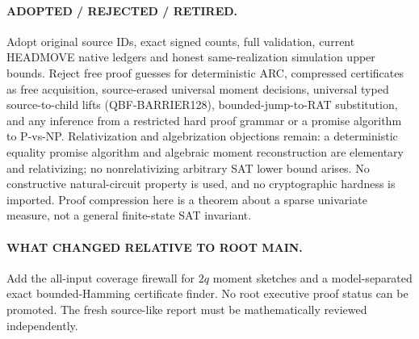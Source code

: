 \documentclass[11pt]{article}
\begin{document}
\paragraph{ADOPTED / REJECTED / RETIRED.} Adopt original source IDs, exact signed counts, full validation, current HEADMOVE native ledgers and honest same-realization simulation upper bounds. Reject free proof guesses for deterministic ARC, compressed certificates as free acquisition, source-erased universal moment decisions, universal typed source-to-child lifts (QBF-BARRIER128), bounded-jump-to-RAT substitution, and any inference from a restricted hard proof grammar or a promise algorithm to P-vs-NP. Relativization and algebrization objections remain: a deterministic equality promise algorithm and algebraic moment reconstruction are elementary and relativizing; no nonrelativizing arbitrary SAT lower bound arises. No constructive natural-circuit property is used, and no cryptographic hardness is imported. Proof compression here is a theorem about a sparse univariate measure, not a general finite-state SAT invariant.
\paragraph{WHAT CHANGED RELATIVE TO ROOT MAIN.} Add the all-input coverage firewall for $2q$ moment sketches and a model-separated exact bounded-Hamming certificate finder. No root executive proof status can be promoted. The fresh source-like report must be mathematically reviewed independently.
\end{document}
